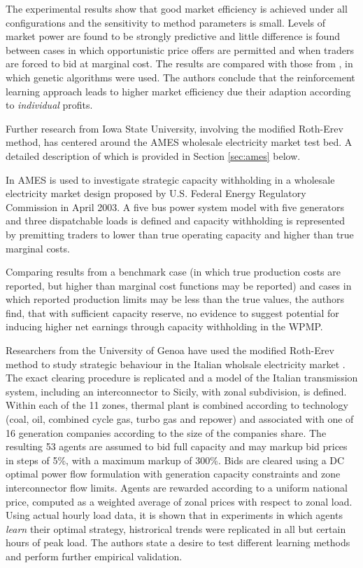 The experimental results show that good market efficiency is achieved under all
configurations and the sensitivity to method parameters is small.  Levels of
market power are found to be strongly predictive and little difference is found
between cases in which opportunistic price offers are permitted and when traders
are forced to bid at marginal cost.  The results are compared with those from
\cite{nicolaisen:2000}, in which genetic algorithms were used.  The authors
conclude that the reinforcement learning approach leads to higher market
efficiency due their adaption according to \textit{individual} profits.

Further research from Iowa State University, involving the modified Roth-Erev
method, has centered around the AMES wholesale electricity market test bed.  A
detailed description of which is provided in Section \ref{sec:ames} below.

In \cite{tesfatsi:psce} AMES is used to investigate strategic capacity
withholding in a wholesale electricity market design proposed by U.S. Federal
Energy Regulatory Commission in April 2003.  A five bus power system model with
five generators and three dispatchable loads is defined and capacity withholding
is represented by premitting traders to lower than true operating capacity and
higher than true marginal costs.

Comparing results from a benchmark case (in which true production costs are
reported, but higher than marginal cost functions may be reported) and cases in
which reported production limits may be less than the true values, the authors
find, that with sufficient capacity reserve, no evidence to suggest potential
for inducing higher net earnings through capacity withholding in the WPMP.

Researchers from the University of Genoa have used the modified Roth-Erev
method to study strategic behaviour in the Italian wholsale electricity market
\cite{cincotti:09}.  The exact clearing procedure is replicated and a model of
the Italian transmission system, including an interconnector to Sicily, with
zonal subdivision, is defined.  Within each of the 11 zones, thermal plant is
combined according to technology (coal, oil, combined cycle gas, turbo gas and
repower) and associated with one of 16 generation companies according to the
size of the companies share.  The resulting 53 agents are assumed to bid full
capacity and may markup bid prices in steps of 5\%, with a maximum markup of
300\%.  Bids are cleared using a DC optimal power flow formulation with
generation capacity constraints and zone interconnector flow limits.  Agents are
rewarded according to a uniform national price, computed as a weighted average
of zonal prices with respect to zonal load.  Using actual hourly load data, it
is shown that in experiments in which agents \textit{learn} their optimal
strategy, histrorical trends were replicated in all but certain hours of peak
load.  The authors state a desire to test different learning methods and perform
further empirical validation.

